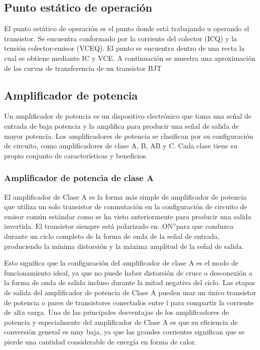 \subsection{Punto estático de operación}

El punto estático de operación es el punto donde está trabajando u operando el transistor. Se encuentra
conformado por la corriente del colector (ICQ) y la tensión colector-emisor (VCEQ). El punto se encuentra dentro de una recta la
cual se obtiene mediante IC y VCE. A continuación se muestra una aproximación de las curvas de transferencia de un transistor
BJT

\subsection{Amplificador de potencia}
Un amplificador de potencia es un dispositivo electrónico que toma una señal de entrada de baja potencia y la amplifica
para producir una señal de salida de mayor potencia. Los amplificadores de potencia se clasifican por su configuración de circuito,
como amplificadores de clase A, B, AB y C. Cada clase tiene su propio conjunto de características y beneficios.

\subsubsection{Amplificador de potencia de clase A}

El amplificador de Clase A es la forma más simple de amplificador de potencia que
utiliza un solo transistor de conmutación en la configuración de circuito de emisor común
estándar como se ha visto anteriormente para producir una salida invertida. El transistor
siempre está polarizado en .ON”para que conduzca durante un ciclo completo de la forma
de onda de la señal de entrada, produciendo la mínima distorsión y la máxima amplitud de
la señal de salida.

Esto significa que la configuración del amplificador de clase A es el modo de funcionamiento ideal, ya que no puede haber distorsión de cruce o desconexión a la forma de onda
de salida incluso durante la mitad negativa del ciclo. Las etapas de salida del amplificador
de potencia de Clase A pueden usar un único transistor de potencia o pares de transistores
conectados entre í para compartir la corriente de alta carga. Una de las principales desventajas de los amplificadores de potencia y especialmente del amplificador de Clase A es
que su eficiencia de conversión general es muy baja, ya que las grandes corrientes significan
que se pierde una cantidad considerable de energía en forma de calor.

